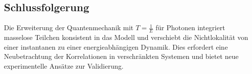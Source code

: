 \documentclass[a4paper,12pt]{article}
\begin{document}
	\subsection{Schlussfolgerung}
	Die Erweiterung der Quantenmechanik mit \( T = \frac{1}{E} \) für Photonen integriert masselose Teilchen konsistent in das Modell und verschiebt die Nichtlokalität von einer instantanen zu einer energieabhängigen Dynamik. Dies erfordert eine Neubetrachtung der Korrelationen in verschränkten Systemen und bietet neue experimentelle Ansätze zur Validierung.
	
\end{document}
